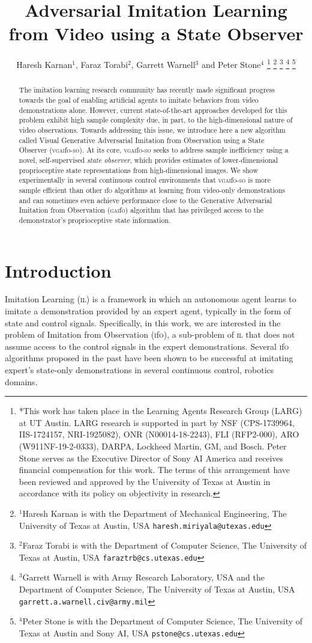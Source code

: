 \documentclass[letterpaper, 10 pt, conference]{ieeeconf}  %
\title{\LARGE \bf
Adversarial Imitation Learning from Video using a State Observer
}
\author{Haresh Karnan$^{1}$, Faraz Torabi$^{2}$, Garrett Warnell$^{3}$ and Peter Stone$^{4}$%
	\thanks{*This work has taken place in the Learning Agents Research Group (LARG) at UT Austin. LARG research is supported in part by NSF (CPS-1739964, IIS-1724157, NRI-1925082), ONR (N00014-18-2243), FLI (RFP2-000), ARO (W911NF-19-2-0333), DARPA, Lockheed Martin, GM, and Bosch. Peter Stone serves as the Executive Director of Sony AI America and receives financial compensation for this work. The terms of this arrangement have been reviewed and approved by the University of Texas at Austin in accordance with its policy on objectivity in research.}%
	\thanks{$^{1}$Haresh Karnan is with the Department of Mechanical Engineering, The University of Texas at Austin, USA
		{\tt\small haresh.miriyala@utexas.edu}}%
	\thanks{$^{2}$Faraz Torabi is with the Department of Computer Science, The University of Texas at Austin, USA
	{\tt\small faraztrb@cs.utexas.edu}}%
	\thanks{$^{3}$Garrett Warnell is with Army Research Laboratory, USA and the Department of Computer Science, The University of Texas at Austin, USA
		{\tt\small garrett.a.warnell.civ@army.mil}}%
	\thanks{$^{4}$Peter Stone is with the Department of Computer Science, The University of Texas at Austin and Sony AI, USA
		{\tt\small pstone@cs.utexas.edu}}%
}
\newcommand{\gaifo}{\textsc{gai}f\textsc{o}}
\newcommand{\ifo}{\textsc{i}f\textsc{o}}
\newcommand{\vgaifoso}{\textsc{vgai}f\textsc{o}-\textsc{so}}
\newcommand{\il}{\textsc{il}}
\begin{document}
\maketitle
\thispagestyle{empty}
\pagestyle{empty}


\begin{abstract}

The imitation learning research community has recently made significant progress towards the goal of enabling artificial agents to imitate behaviors from video demonstrations alone.
However, current state-of-the-art approaches developed for this problem exhibit high sample complexity due, in part, to the high-dimensional nature of video observations.
Towards addressing this issue, we introduce here a new algorithm called Visual Generative Adversarial Imitation from Observation using a State Observer (\vgaifoso{}).
At its core, \vgaifoso{} seeks to address sample inefficiency using a novel, self-supervised \textit{state observer}, which provides estimates of lower-dimensional proprioceptive state representations from high-dimensional images.
We show experimentally in several continuous control environments that \vgaifoso{} is more sample efficient than other \ifo{} algorithms at learning from video-only demonstrations and can sometimes even achieve performance close to the Generative Adversarial Imitation from Observation (\gaifo{}) algorithm that has privileged access to the demonstrator's proprioceptive state information. 

\end{abstract}



\section{Introduction}

Imitation Learning (\il{}) \cite{schaalil, argall} is a framework in which an autonomous agent learns to imitate a demonstration provided by an expert agent, typically in the form of state and control signals. Specifically, in this work, we are interested in the problem of Imitation from Observation (\ifo{}), a sub-problem of \il{} that does not assume access to the control signals in the expert demonstrations. Several \ifo{} algorithms proposed in the past \cite{gaifo, gaifo_proprio, bco, faraz_survey, dealio, contexttranslate, ilpo, rlvid, tpil, voila} have been shown to be successful at imitating expert's state-only demonstrations in several continuous control, robotics domains.
\end{document}
